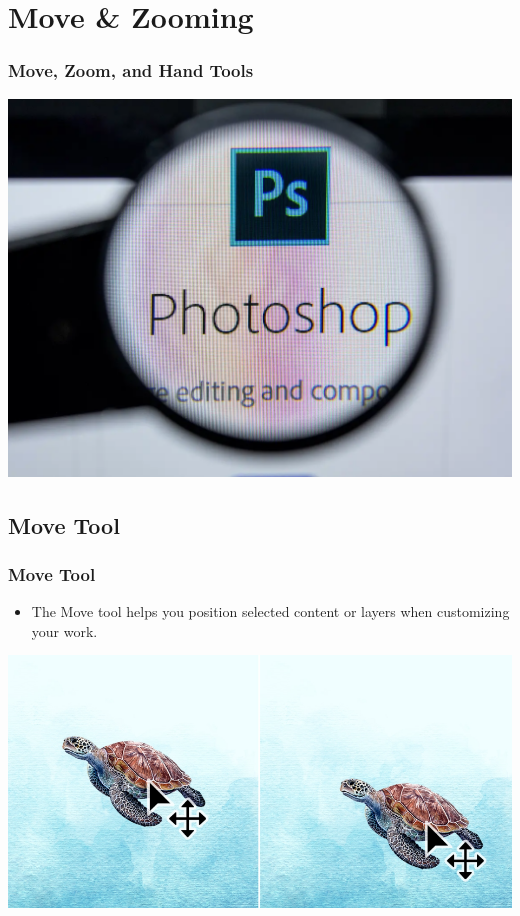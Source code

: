 \documentclass{beamer}
\begin{document}
	
	\section{Move \& Zooming}
	
		\begin{frame}
		\frametitle{Move, Zoom, and Hand Tools}
		\begin{center}
			\includegraphics[width=.7\textwidth]{images/zoom intro.png}
		\end{center}
	\end{frame}
	
\subsection{Move Tool}
\begin{frame}
	\frametitle{Move Tool}
	\begin{itemize}
		\item The Move tool helps you position selected content or layers when customizing your work.
	\end{itemize}
	\begin{center}
		\includegraphics[width = 1.0\textwidth]{images/move tool2.png}
	\end{center}
\end{frame}
\end{document}
